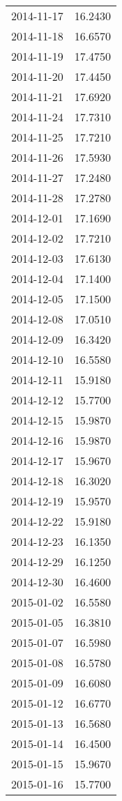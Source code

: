 \begin{tabular}{lr}
2014-11-17 &     16.2430 \\
2014-11-18 &     16.6570 \\
2014-11-19 &     17.4750 \\
2014-11-20 &     17.4450 \\
2014-11-21 &     17.6920 \\
2014-11-24 &     17.7310 \\
2014-11-25 &     17.7210 \\
2014-11-26 &     17.5930 \\
2014-11-27 &     17.2480 \\
2014-11-28 &     17.2780 \\
2014-12-01 &     17.1690 \\
2014-12-02 &     17.7210 \\
2014-12-03 &     17.6130 \\
2014-12-04 &     17.1400 \\
2014-12-05 &     17.1500 \\
2014-12-08 &     17.0510 \\
2014-12-09 &     16.3420 \\
2014-12-10 &     16.5580 \\
2014-12-11 &     15.9180 \\
2014-12-12 &     15.7700 \\
2014-12-15 &     15.9870 \\
2014-12-16 &     15.9870 \\
2014-12-17 &     15.9670 \\
2014-12-18 &     16.3020 \\
2014-12-19 &     15.9570 \\
2014-12-22 &     15.9180 \\
2014-12-23 &     16.1350 \\
2014-12-29 &     16.1250 \\
2014-12-30 &     16.4600 \\
2015-01-02 &     16.5580 \\
2015-01-05 &     16.3810 \\
2015-01-07 &     16.5980 \\
2015-01-08 &     16.5780 \\
2015-01-09 &     16.6080 \\
2015-01-12 &     16.6770 \\
2015-01-13 &     16.5680 \\
2015-01-14 &     16.4500 \\
2015-01-15 &     15.9670 \\
2015-01-16 &     15.7700 \\

\end{tabular}
